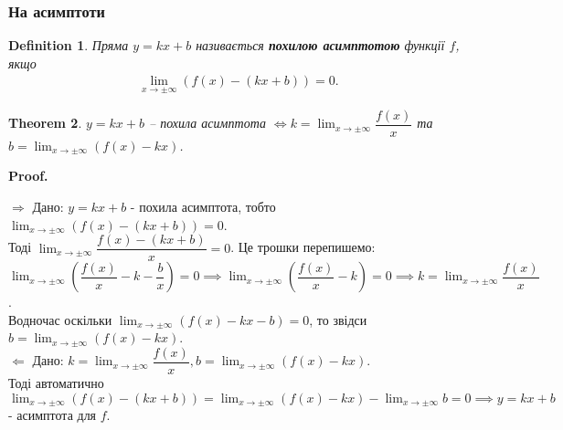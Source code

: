 \documentclass[a4paper, 14pt]{article}
\makeatletter
\def\qed{$\blacksquare$}
\def\rightproof{$\boxed{\Rightarrow}$ }
\def\leftproof{$\boxed{\Leftarrow}$ }
\theoremstyle{theoremdd}
\newtheorem{theorem}{Theorem}[subsection]
\theoremstyle{theoremdd}
\newtheorem{definition}[theorem]{Definition}
\theoremstyle{theoremdd}
\theoremstyle{theoremdd}
\theoremstyle{theoremdd}
\theoremstyle{theoremdd}
\theoremstyle{theoremdd}
\theoremstyle{theoremdd}
\renewenvironment{proof}[1][Proof.\\]{\par
\pushQED{\hfill \qed}%
\normalfont \topsep6\p@\@plus6\p@\relax
\trivlist
\item\relax
{\bfseries
#1\@addpunct{.}}\hspace\labelsep\ignorespaces
}{%
\popQED\endtrivlist\@endpefalse
}
\makeatother
\begin{document}
\subsubsection{На асимптоти}
\begin{definition}
Пряма $y = kx+b$ називається \textbf{похилою асимптотою} функції $f$, якщо
\begin{align*}
\lim_{x \to \pm \infty} (f(x) - (kx+b)) = 0.
\end{align*}
\end{definition}

\begin{theorem}
$y = kx+b$ -- похила асимптота $\iff  k = \displaystyle\lim_{x \to \pm \infty} \dfrac{f(x)}{x}$ та $b = \displaystyle\lim_{x \to \pm \infty} (f(x) - kx)$.
\end{theorem}

\begin{proof}
\rightproof Дано: $y = kx+b$ - похила асимптота, тобто $\displaystyle\lim_{x \to \pm \infty} (f(x) - (kx+b)) = 0$.\\
Тоді $\displaystyle\lim_{x \to \pm \infty} \dfrac{f(x)-(kx+b)}{x} = 0$. Це трошки перепишемо:\\
$\displaystyle\lim_{x \to \pm \infty} \left( \dfrac{f(x)}{x} - k - \dfrac{b}{x} \right) = 0 \implies \lim_{x \to \pm \infty} \left( \dfrac{f(x)}{x} - k \right) = 0 \implies k =\lim_{x \to \pm \infty} \dfrac{f(x)}{x}$.\\
Водночас оскільки $\displaystyle\lim_{x \to \pm \infty} (f(x)-kx-b) = 0$, то звідси $b = \displaystyle\lim_{x \to \pm \infty} (f(x)-kx)$.
\bigskip \\
\leftproof Дано: $k = \displaystyle\lim_{x \to \pm \infty} \dfrac{f(x)}{x}, b = \lim_{x \to \pm \infty} (f(x)-kx)$.\\
Тоді автоматично $\displaystyle\lim_{x \to \pm \infty} (f(x)-(kx+b)) = \lim_{x \to \pm \infty} (f(x)-kx) - \lim_{x \to \pm \infty} b = 0 \implies y =kx+b$ - асимптота для $f$.
\end{proof}
\end{document}
